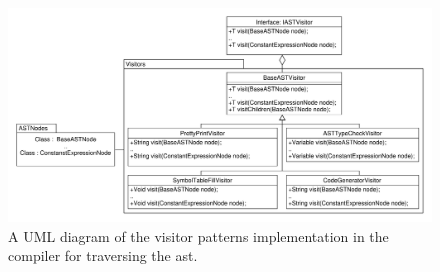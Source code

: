 \begin{figure}[!ht]
\centering
 \includegraphics[width=1\textwidth]{figures/ClassDiagrams/Visitors.pdf} %
\caption{A UML diagram of the visitor patterns implementation in the compiler for traversing the \acrshort{ast}.}\label{image:Visitors}
\vspace{-15pt}
\end{figure}
